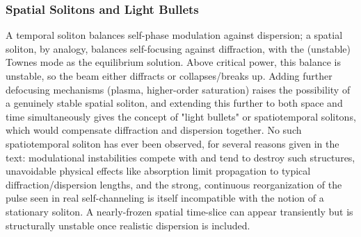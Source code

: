 \documentclass[11pt,a4paper]{article}
\begin{document}
\subsubsection{Spatial Solitons and Light Bullets}
A temporal soliton balances self-phase modulation against dispersion; a spatial soliton, by analogy, balances self-focusing against diffraction, with the (unstable) Townes mode as the equilibrium solution. Above critical power, this balance is unstable, so the beam either diffracts or collapses/breaks up. Adding further defocusing mechanisms (plasma, higher-order saturation) raises the possibility of a genuinely stable spatial soliton, and extending this further to both space and time simultaneously gives the concept of "light bullets" or spatiotemporal solitons, which would compensate diffraction and dispersion together. No such spatiotemporal soliton has ever been observed, for several reasons given in the text: modulational instabilities compete with and tend to destroy such structures, unavoidable physical effects like absorption limit propagation to typical diffraction/dispersion lengths, and the strong, continuous reorganization of the pulse seen in real self-channeling is itself incompatible with the notion of a stationary soliton. A nearly-frozen spatial time-slice can appear transiently but is structurally unstable once realistic dispersion is included.
\end{document}
